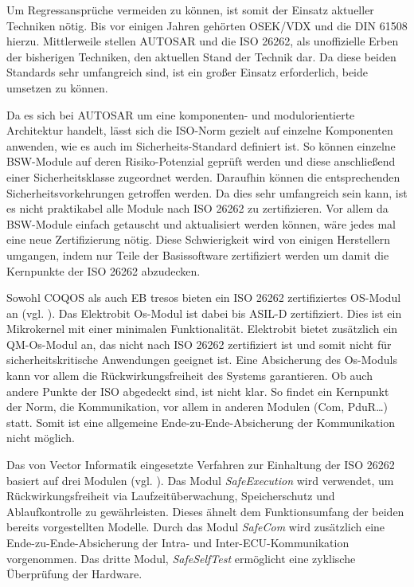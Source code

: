 \documentclass[
  a4paper,					    %
  twoside,
  DIV=calc,     				%
  bibliography=totoc,
  cleardoublepage=empty,
  ngerman,     					%
  final       					%
]{scrbook}
\begin{document}
Um Regressansprüche vermeiden zu können, ist somit der Einsatz aktueller Techniken nötig. Bis vor einigen Jahren gehörten OSEK/VDX und die DIN 61508 hierzu. Mittlerweile stellen AUTOSAR und die ISO 26262, als unoffizielle Erben der bisherigen Techniken, den aktuellen Stand der Technik dar. Da diese beiden Standards sehr umfangreich sind, ist ein großer Einsatz erforderlich, beide umsetzen zu können.

Da es sich bei AUTOSAR um eine komponenten- und modulorientierte Architektur handelt, lässt sich die ISO-Norm gezielt auf einzelne Komponenten anwenden, wie es auch im Sicherheits-Standard definiert ist. So können einzelne BSW-Module auf deren Risiko-Potenzial geprüft werden und diese anschließend einer Sicherheitsklasse zugeordnet werden. Daraufhin können die entsprechenden Sicherheitsvorkehrungen getroffen werden. Da dies sehr umfangreich sein kann, ist es nicht praktikabel alle Module nach ISO 26262 zu zertifizieren. Vor allem da BSW-Module einfach getauscht und aktualisiert werden können, wäre jedes mal eine neue Zertifizierung nötig. Diese Schwierigkeit wird von einigen Herstellern umgangen, indem nur Teile der Basissoftware zertifiziert werden um damit die Kernpunkte der ISO 26262 abzudecken.

Sowohl COQOS als auch EB tresos bieten ein ISO 26262 zertifiziertes OS-Modul an (vgl. \cite{eb_tresos}\cite{coqos}). Das Elektrobit Os-Modul ist dabei bis ASIL-D zertifiziert. Dies ist ein Mikrokernel mit einer minimalen Funktionalität. Elektrobit bietet zusätzlich ein QM-Os-Modul an, das nicht nach ISO 26262 zertifiziert ist und somit nicht für sicherheitskritische Anwendungen geeignet ist. Eine Absicherung des Os-Moduls kann vor allem die Rückwirkungsfreiheit des Systems garantieren. Ob auch andere Punkte der ISO abgedeckt sind, ist nicht klar. So findet ein Kernpunkt der Norm, die Kommunikation, vor allem in anderen Modulen (Com, PduR\dots) statt. Somit ist eine allgemeine Ende-zu-Ende-Absicherung der Kommunikation nicht möglich.

Das von Vector Informatik eingesetzte Verfahren zur Einhaltung der ISO 26262 basiert auf drei Modulen (vgl. \cite{microsar}). Das Modul \emph{SafeExecution} wird verwendet, um Rückwirkungsfreiheit via Laufzeitüberwachung, Speicherschutz und Ablaufkontrolle zu gewährleisten. Dieses ähnelt dem Funktionsumfang der beiden bereits vorgestellten Modelle. Durch das Modul \emph{SafeCom} wird zusätzlich eine Ende-zu-Ende-Absicherung der Intra- und Inter-ECU-Kommunikation vorgenommen. Das dritte Modul, \emph{SafeSelfTest} ermöglicht eine zyklische Überprüfung der Hardware.
\end{document}
